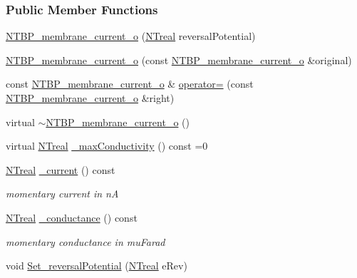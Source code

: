 \subsubsection*{Public Member Functions}
\begin{DoxyCompactItemize}
\item 
\hyperlink{class_n_t_b_p__membrane__current__o_a15c1a512c2483355d0782740c0e32ffc}{NTBP\_\-membrane\_\-current\_\-o} (\hyperlink{nt__types_8h_a814a97893e9deb1eedcc7604529ba80d}{NTreal} reversalPotential)
\item 
\hyperlink{class_n_t_b_p__membrane__current__o_a9b228f7407a4b51476911f799c504784}{NTBP\_\-membrane\_\-current\_\-o} (const \hyperlink{class_n_t_b_p__membrane__current__o}{NTBP\_\-membrane\_\-current\_\-o} \&original)
\item 
const \hyperlink{class_n_t_b_p__membrane__current__o}{NTBP\_\-membrane\_\-current\_\-o} \& \hyperlink{class_n_t_b_p__membrane__current__o_aa825b1f77f6f621f3985780229037dde}{operator=} (const \hyperlink{class_n_t_b_p__membrane__current__o}{NTBP\_\-membrane\_\-current\_\-o} \&right)
\item 
virtual \hyperlink{class_n_t_b_p__membrane__current__o_a47cf58d3b7ab8fdc66d803083336b209}{$\sim$NTBP\_\-membrane\_\-current\_\-o} ()
\item 
virtual \hyperlink{nt__types_8h_a814a97893e9deb1eedcc7604529ba80d}{NTreal} \hyperlink{class_n_t_b_p__membrane__current__o_ac6d13af9946a4714da459cb6cd4ff915}{\_\-maxConductivity} () const =0
\item 
\hyperlink{nt__types_8h_a814a97893e9deb1eedcc7604529ba80d}{NTreal} \hyperlink{class_n_t_b_p__membrane__current__o_a7e28334ebd683a0e2f6955c97555dda8}{\_\-current} () const 
\begin{DoxyCompactList}\small\item\em momentary current in nA \item\end{DoxyCompactList}\item 
\hyperlink{nt__types_8h_a814a97893e9deb1eedcc7604529ba80d}{NTreal} \hyperlink{class_n_t_b_p__membrane__current__o_a482b953e3ba6813e3bf3028fd6d6b7a8}{\_\-conductance} () const 
\begin{DoxyCompactList}\small\item\em momentary conductance in muFarad \item\end{DoxyCompactList}\item 
void \hyperlink{class_n_t_b_p__membrane__current__o_a2d69f4c8cced6517932031821b37a1b5}{Set\_\-reversalPotential} (\hyperlink{nt__types_8h_a814a97893e9deb1eedcc7604529ba80d}{NTreal} eRev)

\end{DoxyCompactItemize}
